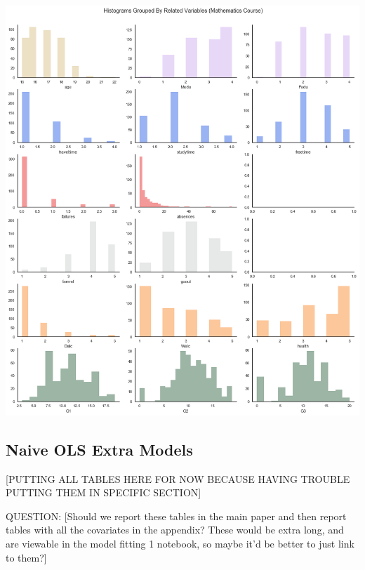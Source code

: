 \documentclass[12pt]{article}
\begin{document}
\includegraphics[scale=0.5]{figures/quantvar_hist_math.png}


\subsection{Naive OLS Extra Models} \label{appendix_naive}

\textcolor{BrickRed}{[PUTTING ALL TABLES HERE FOR NOW BECAUSE HAVING TROUBLE PUTTING THEM IN SPECIFIC SECTION]}

QUESTION: \textcolor{BrickRed}{[Should we report these tables in the main paper and then report tables with all the covariates in the appendix? These would be extra long, and are viewable in the model fitting 1 notebook, so maybe it'd be better to just link to them?]}
\end{document}
